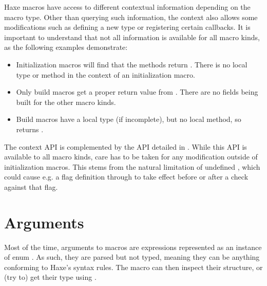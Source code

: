 
Haxe macros have access to different contextual information depending on the macro type. Other than querying such information, the context also allows some modifications such as defining a new type or registering certain callbacks. It is important to understand that not all information is available for all macro kinds, as the following examples demonstrate:

\begin{itemize}
	\item Initialization macros will find that the  methods return . There is no local type or method in the context of an initialization macro.
	\item Only build macros get a proper return value from . There are no fields being built for the other macro kinds.
	\item Build macros have a local type (if incomplete), but no local method, so  returns .
\end{itemize}

The context API is complemented by the  API detailed in . While this API is available to all macro kinds, care has to be taken for any modification outside of initialization macros. This stems from the natural limitation of undefined , which could cause e.g. a flag definition through  to take effect before or after a  check against that flag.

\section{Arguments}
\label{macro-arguments}

Most of the time, arguments to macros are expressions represented as an instance of enum . As such, they are parsed but not typed, meaning they can be anything conforming to Haxe's syntax rules. The macro can then inspect their structure, or (try to) get their type using .


